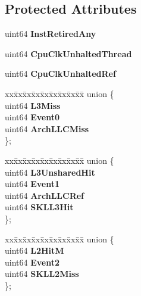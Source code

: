 \subsection*{Protected Attributes}
\begin{DoxyCompactItemize}
\item 
uint64 {\bfseries Inst\+Retired\+Any}\label{classBasicCounterState_a32d89649ba3e48ad8d0cfe05b0e5e2fb}

\item 
uint64 {\bfseries Cpu\+Clk\+Unhalted\+Thread}\label{classBasicCounterState_aa55976b14e3f5d61eac958ea5f80f35c}

\item 
uint64 {\bfseries Cpu\+Clk\+Unhalted\+Ref}\label{classBasicCounterState_a9c64ac8f2c735b0a693a066ff99b9bc1}

\item 
\begin{tabbing}
xx\=xx\=xx\=xx\=xx\=xx\=xx\=xx\=xx\=\kill
union \{\\
\>uint64 {\bfseries L3Miss}\\
\>uint64 {\bfseries Event0}\\
\>uint64 {\bfseries ArchLLCMiss}\\
\}; \label{classBasicCounterState_a959ed48b231cadff965fa70acd60ade7}
\\

\end{tabbing}\item 
\begin{tabbing}
xx\=xx\=xx\=xx\=xx\=xx\=xx\=xx\=xx\=\kill
union \{\\
\>uint64 {\bfseries L3UnsharedHit}\\
\>uint64 {\bfseries Event1}\\
\>uint64 {\bfseries ArchLLCRef}\\
\>uint64 {\bfseries SKLL3Hit}\\
\}; \label{classBasicCounterState_a21d9f8b810e7625a425c469cd6fae52f}
\\

\end{tabbing}\item 
\begin{tabbing}
xx\=xx\=xx\=xx\=xx\=xx\=xx\=xx\=xx\=\kill
union \{\\
\>uint64 {\bfseries L2HitM}\\
\>uint64 {\bfseries Event2}\\
\>uint64 {\bfseries SKLL2Miss}\\
\}; \label{classBasicCounterState_a26f75e8ad60efecbdb155be81cc78ab8}
\\


\end{tabbing}
\end{DoxyCompactItemize}
